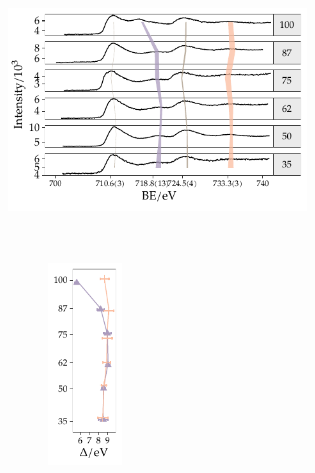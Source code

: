 \documentclass[webedition,openright,titles,swedish,english]{LuaUUThesis}\usepackage[]{graphicx}\usepackage[]{xcolor}
\newenvironment{knitrout}{}{} %
\begin{document}
\begin{figure}[tbp]
\centering%
\begin{subfigure}[b]{0.66\textwidth}%
\begin{knitrout}\scriptsize
{}\color{fgcolor}

{\centering \includegraphics[width=3.11in]{figure/0503P-fig-xps-Fe2p-spectra-1} 

}


\end{knitrout}
\caption{}%
\label{fig:P03-XPS-Fe2p-spectra}%
\end{subfigure}%
\,%
\begin{subfigure}[b]{0.33\textwidth}%
\begin{subfigure}[b]{0.50\linewidth}%
\begin{knitrout}\scriptsize
{}\color{fgcolor}

{\centering \includegraphics[width=0.77in]{figure/0503P-fig-xps-Fe2p-satellite-delta-1} 

}


\end{knitrout}
\caption{}%
\label{fig:P03-XPS-Fe2p-satellite-delta}%
\end{subfigure}%
\begin{subfigure}[b]{0.50\linewidth}%
\begin{knitrout}\scriptsize
{}\color{fgcolor}


\end{knitrout}
\end{subfigure}
\end{subfigure}
\end{figure}
\end{document}
